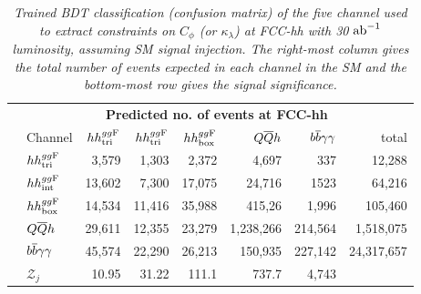 \begin{table}[]
{		\begin{tabular}{ll|rrrrr|r}
			\multirow{7}{*}{\rb{\bf Actual no. of events\hspace{0.45cm}}} & \multicolumn{7}{c}{\bf Predicted no. of events at FCC-hh}\\
			\cmidrule[\heavyrulewidth]{2-8}
			& Channel & $hh^{gg\rm F}_{\rm tri}$ & $hh^{gg\rm F}_{\rm tri}$ &  $hh^{gg\rm F}_{\rm box}$&      $Q\overline Q h$ & $b\overline b\gamma\gamma$ &   total \\
			\cline{2-8}
			&$hh^{gg\rm F}_{\rm tri}$       &  	3,579& 1,303&	2,372&	4,697&	337&	12,288 \\
			&$hh^{gg\rm F}_{\rm int}$       &  13,602& 7,300&	17,075&	24,716&	1523&	64,216 \\
			&$hh^{gg\rm F}_{\rm box}$       &  14,534&	11,416&	35,988&	415,26& 1,996&	105,460 \\
			&$Q\overline Q h$         & 29,611&	12,355&	23,279&	1,238,266&	214,564&	1,518,075 \\
			&$b\overline b\gamma\gamma$        &  45,574&	22,290&	26,213&	150,935&	227,142&	24,317,657 \\
			\cline{2-8}
			&$\mathcal{Z}_j$&   	10.95&	31.22&	111.1&	737.7&	4,743&	 \\
			\cmidrule[\heavyrulewidth]{2-8}
		\end{tabular}
	}
	\caption{\it Trained BDT classification (confusion matrix) of the five channel used to extract constraints on $C_\phi$ (or $\kappa_\lambda$) at FCC-hh with 30 $\text{ab}^{-1}$ luminosity, assuming SM signal injection. The right-most column gives the total number of events expected in each channel in the SM and the bottom-most row gives the signal significance.}
	\label{tab:FCC-hh-confusion-CH}
\end{table}
